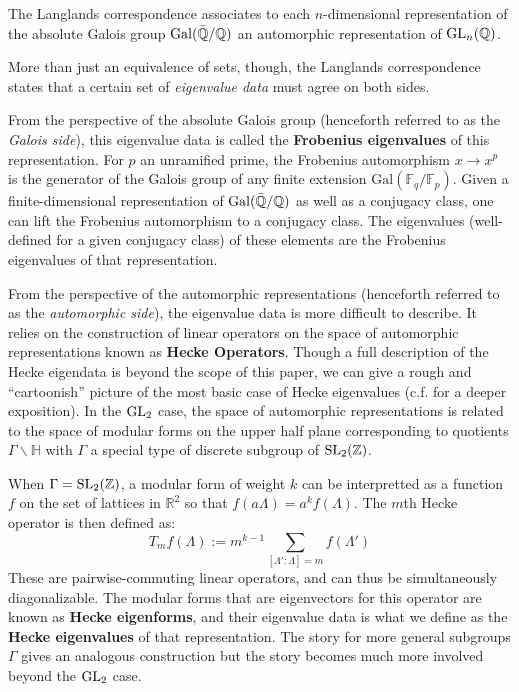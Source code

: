 \begin{idea}
	The Langlands correspondence associates to each $n$-dimensional representation of the absolute Galois group $\mathrm{Gal}(\bar {\mathbb{Q}}/\mathbb{Q})$ an automorphic representation of $\mathrm{GL}_n(\mathbb{Q})$.
\end{idea}
More than just an equivalence of sets, though, the Langlands correspondence states that a certain set of \emph{eigenvalue data} must agree on both sides. 

From the perspective of the absolute Galois group (henceforth referred to as the \emph{Galois side}), this eigenvalue data is called the \textbf{Frobenius eigenvalues} of this representation. For $p$ an unramified prime, the Frobenius automorphism $x \to x^p$ is the generator of the Galois group of any finite extension $\mathrm{Gal}(\mathbb F_q/\mathbb F_p)$. Given a finite-dimensional representation of $\mathrm{Gal}(\bar {\mathbb{Q}}/\mathbb{Q})$ as well as a conjugacy class, one can lift the Frobenius automorphism to a conjugacy class. The eigenvalues (well-defined for a given conjugacy class) of these elements are the Frobenius eigenvalues of that representation. 

From the perspective of the automorphic representations (henceforth referred to as the \emph{automorphic side}), the eigenvalue data is more difficult to describe. It relies on the construction of linear operators on the space of automorphic representations known as \textbf{Hecke Operators}. Though a full description of the Hecke eigendata is beyond the scope of this paper, we can give a rough and ``cartoonish'' picture of the most basic case of Hecke eigenvalues (c.f. \cite{miyake1971, kudla2004} for a deeper exposition). In the $\mathrm{GL}_2$ case, the space of automorphic representations is related to the space of modular forms on the upper half plane corresponding to quotients $\Gamma \backslash \mathbb H$ with $\Gamma$ a special type of discrete subgroup of $\mathrm{SL}_2(\mathbb Z)$. 

When $\Gamma = \mathrm{SL}_2(\mathbb Z)$, a modular form of weight $k$ can be interpretted as a function $f$ on the set of lattices in $\mathbb R^2$ so that $f(a\Lambda) = a^k f(\Lambda)$.
The $m$th Hecke operator is then defined as:
\[
	T_m f (\Lambda) := m^{k-1} \sum_{[\Lambda' : \Lambda] = m} f(\Lambda')
\]
These are pairwise-commuting linear operators, and can thus be simultaneously diagonalizable. 
The modular forms that are eigenvectors for this operator are known as \textbf{Hecke eigenforms}, and their eigenvalue data is what we define as the \textbf{Hecke eigenvalues} of that representation. The story for more general subgroups $\Gamma$ gives an analogous construction but the story becomes much more involved beyond the $\mathrm{GL}_2$ case.


